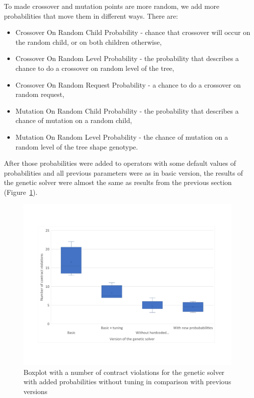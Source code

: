 To made crossover and mutation points are more random, we add more probabilities that move them in different ways.
There are:
\begin{itemize}
	\item Crossover On Random Child Probability - chance that crossover will occur on the random child, or on both children otherwise,
	\item Crossover On Random Level Probability - the probability that describes a chance to do a crossover on random level of the tree, 
	\item Crossover On Random Request Probability - a chance to do a crossover on random request,
	\item Mutation On Random Child Probability - the probability that describes a chance of mutation on a random child,
	\item Mutation On Random Level Probability - the chance of mutation on a random level of the tree shape genotype.
\end{itemize}

After those probabilities were added to operators with some default values of probabilities and all previous parameters were as in basic version, the results of the genetic solver were almost the same as results from the previous section (Figure~\ref{fig:boxplotsolverNewParameters}).
\begin{figure}
	\centering
	\includegraphics[width=\textwidth]{images/BoxPlotSolverNewParameters.pdf}
	\caption[Boxplot with a number of contract violations for the genetic solver with added probabilities without tuning in comparison with previous versions]{Boxplot with a number of contract violations for the genetic solver with added probabilities without tuning in comparison with previous versions}
	\label{fig:boxplotsolverNewParameters}
\end{figure}

